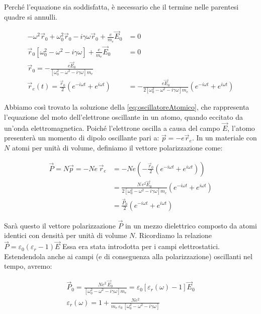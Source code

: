 Perché l'equazione sia soddisfatta, è necessario che il termine nelle parentesi quadre si annulli.

\begin{equation*}
	\begin{aligned}
		-\omega^2 \vec{r}_0 + \omega_0 ^2 \vec{r}_0 - i\gamma \omega \vec{r}_0 + \frac{e}{m_e}\vec{E}_0 &=0 \\
		\vec{r}_0[\omega_0^2 -\omega^2  - i\gamma \omega] + \frac{e}{m_e} \vec{E}_0 &=0 \\
		\vec{r}_0 = -\frac{e\vec{E}_0}{[\omega_0^2 -\omega^2  - i\gamma \omega]m_e} \\
		\vec{r}_e(t) = \frac{\vec{r}_0}{2} (e^{-i\omega t}+e^{i\omega t}  ) &= -\frac{e\vec{E}_0}{2[\omega_0^2 -\omega^2  - i\gamma \omega]m_e} (e^{-i\omega t}+e^{i\omega t}  )
	\end{aligned}
\end{equation*}

Abbiamo così trovato la soluzione della \eqref{eq:oscillatoreAtomico}, che rappresenta l'equazione del moto dell'elettrone oscillante in un atomo, quando eccitato da un'onda elettromagnetica. Poiché l'elettrone oscilla a causa del campo $\vec{E}$, l'atomo presenterà un momento di dipolo oscillante pari a: $ \vec{p} = -e \vec{r}_e  $. In un materiale con $N$ atomi per unità di volume, definiamo il vettore polarizzazione come:

\begin{equation*}
	\begin{aligned}
		\vec{P} = N\vec{p} =-Ne\,\vec{r}_e &= -N e \left( -\frac{\vec{r}_0}{2}(e^{-i\omega t}+e^{i\omega t}) \right) \\
		&= \frac{N\,e^2 \vec{E}_0}{2[\omega_0^2-\omega^2 -i\gamma \omega]m_e}(e^{-i\omega t}+e^{i\omega t}) \\
		&= \frac{\vec{P}_0}{2} (e^{-i\omega t}+e^{i\omega t})
	\end{aligned}
\end{equation*}

Sarà questo il vettore polarizzazione $\vec{P}$ in un mezzo dielettrico composto da atomi identici con densità per unità di volume $N$.
Ricordiamo la relazione $ \vec{P} = \varepsilon_0 (\varepsilon_r -1)\vec{E}  $
Essa era stata introdotta per i campi elettrostatici. Estendendola anche ai campi (e di conseguenza alla polarizzazione) oscillanti nel tempo, avremo:

\begin{gather*}
	\vec{P}_0 = \frac{Ne^2 \,\vec{E}_0}{[\omega_0^2-\omega^2 -i\gamma \omega]m_e} = \varepsilon_0 \left[ \varepsilon_r (\omega) -1 \right] \vec{E}_0 \\
	\boxed{\varepsilon_r (\omega) = 1 + \frac{Ne^2}{m_e\,\varepsilon_0\,[\omega_0^2-\omega^2 -i\gamma \omega]}}
\end{gather*}

